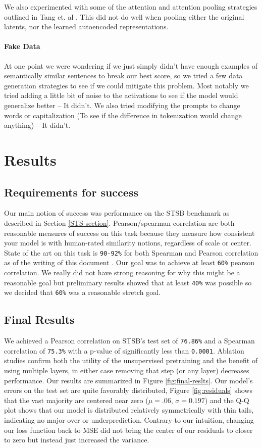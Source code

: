 \documentclass{article}
\begin{document}
We also experimented with some of the attention and attention pooling strategies outlined in Tang et. al \cite{tang2024poolingattentioneffectivedesigns}. This did not do well when pooling either the original latents, nor the learned autoencoded representations.

\paragraph*{Fake Data}
At one point we were wondering if we just simply didn't have enough examples of semantically similar sentences to break our best score, so we tried a few data generation strategies to see if we could mitigate this problem. Most notably we tried adding a little bit of noise to the activations to see if the model would generalize better -- It didn't. We also tried modifying the prompts to change words or capitalization (To see if the difference in tokenization would change anything) -- It didn't.

\section{Results}
\subsection{Requirements for success}
Our main notion of success was performance on the STSB \cite{STS} benchmark as described in Section \ref{STS-section}. Pearson/spearman correlation are both reasonable measures of success on this task because they measure how consistent your model is with human-rated similarity notions, regardless of scale or center. State of the art on this task is \verb|90-92%| for both Spearman and Pearson correlation as of the writing of this document \cite{muennighoff2022mteb}. Our goal was to achieve at least \verb|60%| pearson correlation. We really did not have strong reasoning for why this might be a reasonable goal but preliminary results showed that at least \verb|40%| was possible so we decided that \verb|60%| was a reasonable stretch goal.

\subsection{Final Results}
We achieved a Pearson correlation on STSB's test set of \verb|76.86%| and a Spearman correlation of \verb|75.3%| with a p-value of significantly less than \verb|0.0001|. Ablation studies confirm both the utility of the unsupervised pretraining and the benefit of using multiple layers, in either case removing that step (or any layer) decreases performance. Our results are summarized in Figure \ref{fig:final-reslts}. Our model's errors on the test set are quite favorably distributed, Figure \ref{fig:residuals} shows that the vast majority are centered near zero ($\mu = .06$, $\sigma = 0.197$) and the Q-Q plot shows that our model is distributed relatively symmetrically with thin tails, indicating no major over or underprediction. Contrary to our intuition, changing our loss function back to MSE did not bring the center of our residuals to closer to zero but instead just increased the variance.
\end{document}
